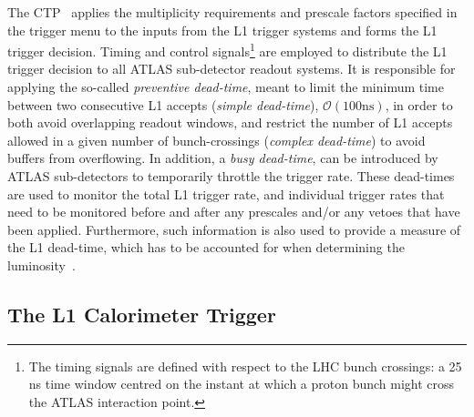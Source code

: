 			The CTP~\cite{ATLASJINST} applies the multiplicity requirements and prescale factors specified in the trigger menu to the inputs from the L1 trigger systems and forms the L1 trigger decision. Timing and control signals\footnote{The timing signals are defined with respect to the LHC bunch crossings: a 25 ns time window centred on the instant at which a proton bunch might cross the ATLAS interaction point.} are employed to distribute the L1 trigger decision to all ATLAS sub-detector readout systems. It is responsible for applying the so-called \emph{preventive dead-time}, meant to limit the minimum time between two consecutive L1 accepts (\emph{simple dead-time}), $\mathcal{O}(100 \mathrm{ns})$, in order to both avoid overlapping readout windows, and restrict the number of L1 accepts allowed in a given number of bunch-crossings (\emph{complex dead-time}) to avoid buffers from overflowing. In addition, a \emph{busy dead-time}, can be introduced by ATLAS sub-detectors to temporarily throttle the trigger rate. These dead-times are used to monitor the total L1 trigger rate, and individual trigger rates that need to be monitored before and after any prescales and/or any vetoes that have been applied. Furthermore, such information is also used to provide a measure of the L1 dead-time, which has to be accounted for when determining the luminosity~\cite{ATLASTrigger2010}.

		
		\subsection{The L1 Calorimeter Trigger}

